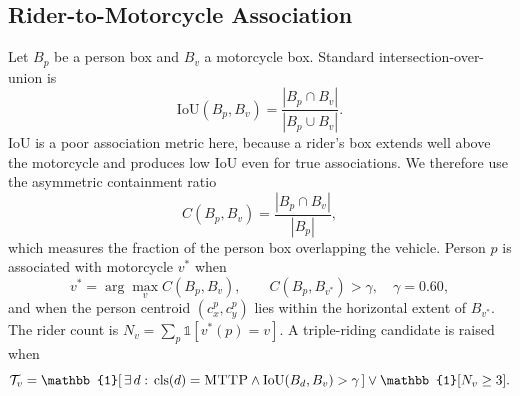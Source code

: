 \documentclass[conference]{IEEEtran}
\begin{document}
\subsection{Rider-to-Motorcycle Association}
Let $B_p$ be a person box and $B_v$ a motorcycle box. Standard intersection-over-union is
\begin{equation}
\mathrm{IoU}(B_p, B_v) = \frac{|B_p \cap B_v|}{|B_p \cup B_v|}.
\end{equation}
IoU is a poor association metric here, because a rider's box extends well above the motorcycle and produces low IoU even for true associations. We therefore use the asymmetric containment ratio
\begin{equation}
C(B_p, B_v) = \frac{|B_p \cap B_v|}{|B_p|},
\end{equation}
which measures the fraction of the person box overlapping the vehicle. Person $p$ is associated with motorcycle $v^{*}$ when
\begin{equation}
v^{*} = \arg\max_{v} C(B_p, B_v), \qquad C(B_p, B_{v^{*}}) > \gamma, \quad \gamma = 0.60,
\end{equation}
and when the person centroid $(c^p_x, c^p_y)$ lies within the horizontal extent of $B_{v^{*}}$. The rider count is $N_v = \sum_p \mathbb{1}[v^{*}(p)=v]$. A triple-riding candidate is raised when
\begin{equation}
\mathcal{T}_v = \mathbb{1}\!\left[\,\exists\, d:\, \mathrm{cls}(d)=\textsc{MTTP} \wedge \mathrm{IoU}(B_d,B_v)>\gamma\,\right] \vee \mathbb{1}[N_v \geq 3].
\end{equation}
\end{document}
